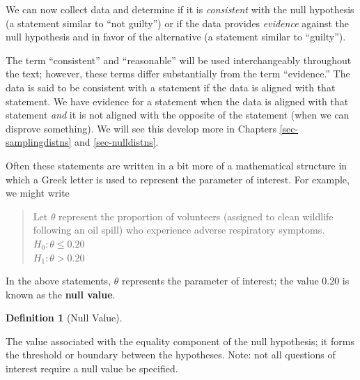 \documentclass[
  letterpaper,
  DIV=11,
  numbers=noendperiod]{scrreprt}
\theoremstyle{definition}
\newtheorem{definition}{Definition}[chapter]
\theoremstyle{definition}
\theoremstyle{plain}
\theoremstyle{remark}
\begin{document}
We can now collect data and determine if it is \emph{consistent} with
the null hypothesis (a statement similar to ``not guilty'') or if the
data provides \emph{evidence} against the null hypothesis and in favor
of the alternative (a statement similar to ``guilty'').

\begin{tcolorbox}[enhanced jigsaw, colbacktitle=quarto-callout-warning-color!10!white, colback=white, left=2mm, title=\textcolor{quarto-callout-warning-color}{\faExclamationTriangle}\hspace{0.5em}{Consistent vs.~Evidence}, toptitle=1mm, leftrule=.75mm, breakable, bottomrule=.15mm, arc=.35mm, rightrule=.15mm, toprule=.15mm, coltitle=black, opacityback=0, colframe=quarto-callout-warning-color-frame, opacitybacktitle=0.6, bottomtitle=1mm, titlerule=0mm]

The term ``consistent'' and ``reasonable'' will be used interchangeably
throughout the text; however, these terms differ substantially from the
term ``evidence.'' The data is said to be consistent with a statement if
the data is aligned with that statement. We have evidence for a
statement when the data is aligned with that statement \emph{and} it is
not aligned with the opposite of the statement (when we can disprove
something). We will see this develop more in Chapters
\ref{sec-samplingdistns} and \ref{sec-nulldistns}.

\end{tcolorbox}

Often these statements are written in a bit more of a mathematical
structure in which a Greek letter is used to represent the parameter of
interest. For example, we might write

\begin{quote}
Let \(\theta\) represent the proportion of volunteers (assigned to clean
wildlife following an oil spill) who experience adverse respiratory
symptoms.\\
\(H_0: \theta \leq 0.20\)\\
\(H_1: \theta > 0.20\)
\end{quote}

In the above statements, \(\theta\) represents the parameter of
interest; the value 0.20 is known as the \textbf{null value}.

\begin{definition}[Null
Value]\protect\hypertarget{def-null-value}{}\label{def-null-value}

The value associated with the equality component of the null hypothesis;
it forms the threshold or boundary between the hypotheses. Note: not all
questions of interest require a null value be specified.

\end{definition}
\end{document}
